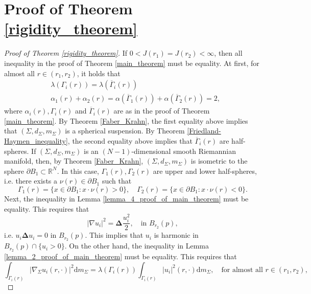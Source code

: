\documentclass{article}
\theoremstyle{remark}
\numberwithin{equation}{section}
\theoremstyle{definition}
\begin{document}
\section{Proof of Theorem \ref{rigidity_theorem}}
\begin{proof}[Proof of Theorem \ref{rigidity_theorem}]
	If $0<J(r_{1})=J(r_{2})<\infty$, then all inequality in the proof of Theorem \ref{main_theorem} must be equality. At first, for almost all $r \in (r_{1},r_{2})$, it holds that
	\begin{equation}
		\begin{split}
			& \lambda(\Gamma_{i}(r))=\lambda(\overline{\Gamma}_{i}(r))\\
			& \alpha_{1}(r)+\alpha_{2}(r) = \alpha(\overline{\Gamma}_{1}(r)) + \alpha (\overline{\Gamma}_{2}(r)) = 2,
		\end{split}
	\end{equation}
	where $\alpha_{i}(r),\Gamma_{i}(r)$ and $\overline{\Gamma}_{i}(r)$ are as in the proof of Theorem \ref{main_theorem}. By Theorem \ref{Faber_Krahn}, the first equality above implies that $(\Sigma,d_{\Sigma},m_{\Sigma})$ is a spherical suspension. By Theorem \ref{Friedland-Haymen_inequality}, the second equality above implies that $\overline{\Gamma}_{i}(r)$ are half-spheres. If $(\Sigma,d_{\Sigma},m_{\Sigma})$ is an $(N-1)$-dimensional smooth Riemannian manifold, then, by Theorem \ref{Faber_Krahn}, $(\Sigma,d_{\Sigma},m_{\Sigma})$ is isometric to the sphere $\partial B_{1} \subset \mathbb{R}^{N}$. In this case, $\Gamma_{1}(r),\Gamma_{2}(r)$ are upper and lower half-spheres, i.e. there exists a $\nu(r) \in \partial B_{1}$ such that
	\begin{equation}
		\Gamma_{1}(r) = \{x \in \partial B_{1} : x\cdot \nu(r) >0\},\quad \Gamma_{2}(r) = \{x\in \partial B_{1} : x\cdot \nu(r)<0\}.
	\end{equation}
	Next, the inequality in Lemma \ref{lemma_4_proof_of_main_theorem} must be equality. This requires that
	\begin{equation}
		\lvert \nabla u_{i} \rvert^{2} = \mathbf{\Delta} \frac{u_{i}^{2}}{2},\quad \text{in } B_{r_{2}}(p),
	\end{equation}
	i.e. $u_{i}\mathbf{\Delta}u_{i}=0$ in $B_{r_{2}}(p)$. This implies that $u_{i}$ is harmonic in $B_{r_{2}}(p) \cap \{u_{i}>0\}$. On the other hand, the inequality in Lemma \ref{lemma_2_proof_of_main_theorem} must be equality. This requires that
	\begin{equation}
		\int_{\Gamma_{i}(r)} \lvert \nabla_{\Sigma} u_{i}(r,\cdot)\rvert^{2} \mathrm{d}m_{\Sigma} = \lambda(\Gamma_{i}(r)) \int_{\Gamma_{i}(r)} \lvert u_{i}\rvert^{2}(r,\cdot) \mathrm{d}m_{\Sigma},\quad \text{for almost all } r \in (r_{1},r_{2}),

\end{equation}
\end{proof}
\end{document}
